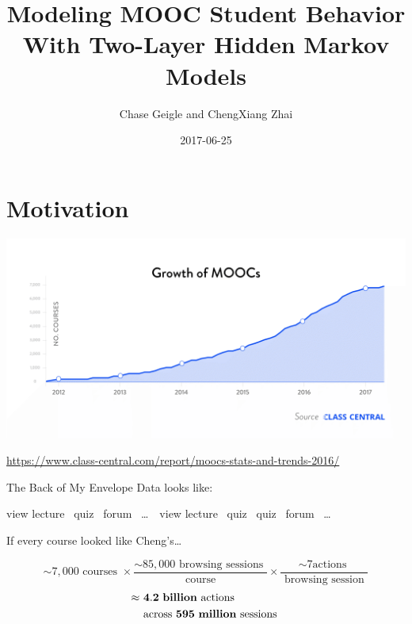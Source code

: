 \documentclass[10pt]{beamer}
\title{Modeling MOOC Student Behavior With Two-Layer Hidden Markov Models}
\author{Chase Geigle and ChengXiang Zhai}
\institute{Department of Computer Science, University of Illinois at
Urbana-Champaign}
\date{2017-06-25}
\begin{document}
\maketitle

\section{Motivation}

\begin{frame}
  \begin{center}
      \includegraphics[width=\textwidth]{figures/Growth-of-MOOCs.png}

      \small{\url{https://www.class-central.com/report/moocs-stats-and-trends-2016/}}
  \end{center}
\end{frame}

\begin{frame}{The Back of My Envelope}
  Data looks like:
  \begin{center}
    view lecture \rightarrow\, quiz \rightarrow\, forum \rightarrow\,
    \ldots\, \rightarrow\, view lecture \rightarrow\, quiz \rightarrow\,
    quiz \rightarrow\, forum \rightarrow\, \ldots
  \end{center}

  If every course looked like Cheng's\ldots
  \begin{center}
      \[
        \sim 7,000\text{ courses } \times \frac{\sim 85,000\text{ browsing
        sessions }}{\text{ course }} \times \frac{\sim 7\text{
        actions }}{\text{ browsing session }}
      \]
      \Large
      \begin{align*}
        \approx &\text{ } \mathbf{4.2} \text{ \textbf{billion} actions }
        \\
        &\text{ across } \mathbf{595} \text{ \textbf{million} sessions }
      \end{align*}
  \end{center}
\end{frame}
\end{document}
